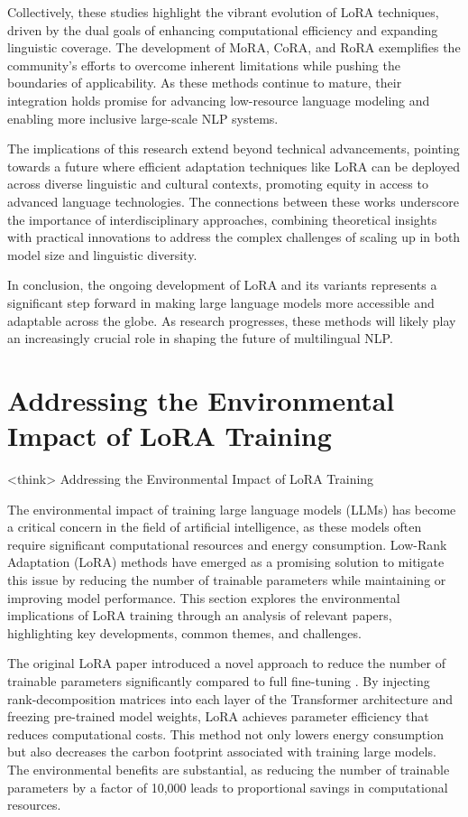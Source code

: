 \documentclass[conference]{IEEEtran}
\begin{document}
Collectively, these studies highlight the vibrant evolution of LoRA techniques, driven by the dual goals of enhancing computational efficiency and expanding linguistic coverage. The development of MoRA, CoRA, and RoRA exemplifies the community's efforts to overcome inherent limitations while pushing the boundaries of applicability. As these methods continue to mature, their integration holds promise for advancing low-resource language modeling and enabling more inclusive large-scale NLP systems.

The implications of this research extend beyond technical advancements, pointing towards a future where efficient adaptation techniques like LoRA can be deployed across diverse linguistic and cultural contexts, promoting equity in access to advanced language technologies. The connections between these works underscore the importance of interdisciplinary approaches, combining theoretical insights with practical innovations to address the complex challenges of scaling up in both model size and linguistic diversity.

In conclusion, the ongoing development of LoRA and its variants represents a significant step forward in making large language models more accessible and adaptable across the globe. As research progresses, these methods will likely play an increasingly crucial role in shaping the future of multilingual NLP.

\section{Addressing the Environmental Impact of LoRA Training}
<think>
Addressing the Environmental Impact of LoRA Training

The environmental impact of training large language models (LLMs) has become a critical concern in the field of artificial intelligence, as these models often require significant computational resources and energy consumption. Low-Rank Adaptation (LoRA) methods have emerged as a promising solution to mitigate this issue by reducing the number of trainable parameters while maintaining or improving model performance. This section explores the environmental implications of LoRA training through an analysis of relevant papers, highlighting key developments, common themes, and challenges.

The original LoRA paper introduced a novel approach to reduce the number of trainable parameters significantly compared to full fine-tuning \cite{bX}. By injecting rank-decomposition matrices into each layer of the Transformer architecture and freezing pre-trained model weights, LoRA achieves parameter efficiency that reduces computational costs. This method not only lowers energy consumption but also decreases the carbon footprint associated with training large models. The environmental benefits are substantial, as reducing the number of trainable parameters by a factor of 10,000 leads to proportional savings in computational resources.
\end{document}
